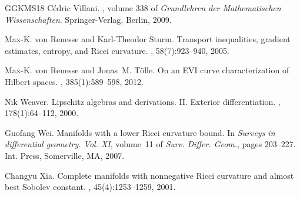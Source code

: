 \documentclass[11pt]{article}
\numberwithin{equation}{section}
\begin{document}
{\begin{thebibliography}{GGKMS18}
C{\'e}dric Villani.
, volume 338 of {\em Grundlehren
  der Mathematischen Wissenschaften}.
\newblock Springer-Verlag, Berlin, 2009.

Max-K. von Renesse and Karl-Theodor Sturm.
\newblock Transport inequalities, gradient estimates, entropy, and {R}icci
  curvature.
, 58(7):923--940, 2005.

Max-K. von Renesse and Jonas~M. T\"{o}lle.
\newblock On an {EVI} curve characterization of {H}ilbert spaces.
, 385(1):589--598, 2012.

Nik Weaver.
\newblock Lipschitz algebras and derivations. {II}. {E}xterior differentiation.
, 178(1):64--112, 2000.

Guofang Wei.
\newblock Manifolds with a lower {R}icci curvature bound.
\newblock In {\em Surveys in differential geometry. {V}ol. {XI}}, volume~11 of
  {\em Surv. Differ. Geom.}, pages 203--227. Int. Press, Somerville, MA, 2007.

Changyu Xia.
\newblock Complete manifolds with nonnegative {R}icci curvature and almost best
  {S}obolev constant.
, 45(4):1253--1259, 2001.

\end{thebibliography}

%
%
}
\end{document}
